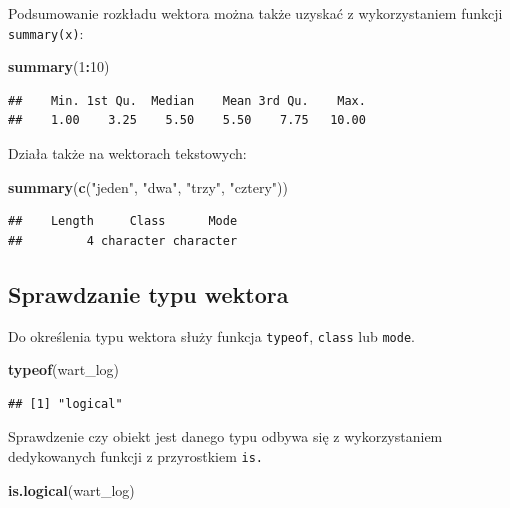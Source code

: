\documentclass[]{book}
\newenvironment{Shaded}{\begin{snugshade}}{\end{snugshade}}
\newcommand{\KeywordTok}[1]{\textcolor[rgb]{0.13,0.29,0.53}{\textbf{#1}}}
\newcommand{\DecValTok}[1]{\textcolor[rgb]{0.00,0.00,0.81}{#1}}
\newcommand{\StringTok}[1]{\textcolor[rgb]{0.31,0.60,0.02}{#1}}
\newcommand{\OperatorTok}[1]{\textcolor[rgb]{0.81,0.36,0.00}{\textbf{#1}}}
\newcommand{\NormalTok}[1]{#1}
\begin{document}
Podsumowanie rozkładu wektora można także uzyskać z wykorzystaniem
funkcji \texttt{summary(x)}:

\begin{Shaded}
\begin{Highlighting}[]
\KeywordTok{summary}\NormalTok{(}\DecValTok{1}\OperatorTok{:}\DecValTok{10}\NormalTok{)}
\end{Highlighting}
\end{Shaded}

\begin{verbatim}
##    Min. 1st Qu.  Median    Mean 3rd Qu.    Max. 
##    1.00    3.25    5.50    5.50    7.75   10.00
\end{verbatim}

Działa także na wektorach tekstowych:

\begin{Shaded}
\begin{Highlighting}[]
\KeywordTok{summary}\NormalTok{(}\KeywordTok{c}\NormalTok{(}\StringTok{"jeden"}\NormalTok{, }\StringTok{"dwa"}\NormalTok{, }\StringTok{"trzy"}\NormalTok{, }\StringTok{"cztery"}\NormalTok{))}
\end{Highlighting}
\end{Shaded}

\begin{verbatim}
##    Length     Class      Mode 
##         4 character character
\end{verbatim}

\subsection{Sprawdzanie typu wektora}\label{sprawdzanie-typu-wektora}

Do określenia typu wektora służy funkcja \texttt{typeof}, \texttt{class}
lub \texttt{mode}.

\begin{Shaded}
\begin{Highlighting}[]
\KeywordTok{typeof}\NormalTok{(wart_log)}
\end{Highlighting}
\end{Shaded}

\begin{verbatim}
## [1] "logical"
\end{verbatim}

Sprawdzenie czy obiekt jest danego typu odbywa się z wykorzystaniem
dedykowanych funkcji z przyrostkiem \texttt{is.}

\begin{Shaded}
\begin{Highlighting}[]
\KeywordTok{is.logical}\NormalTok{(wart_log)}
\end{Highlighting}
\end{Shaded}
\end{document}
